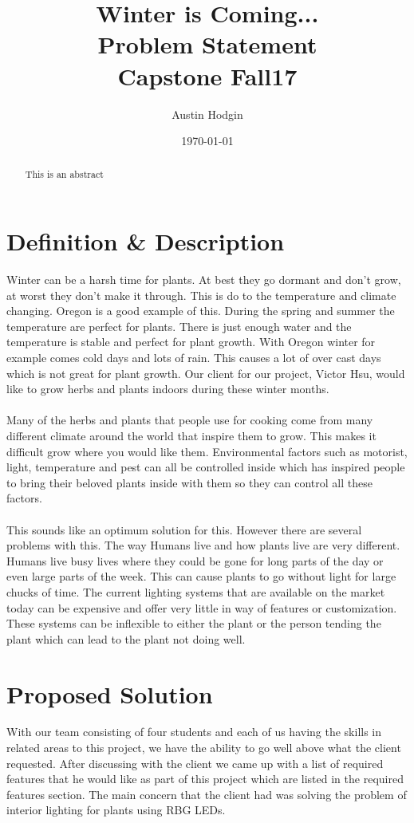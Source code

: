 \documentclass[letterpaper,10pt,draftclsnofoot,onecolumn]{article}
\title{Winter is Coming...\\\large Problem Statement\\\large Capstone Fall17}
\author{Austin Hodgin}
\date{\today}
\begin{document}
	\begin{titlingpage}
		\maketitle
		\begin{abstract}
			This is an abstract
		\end{abstract}
	\end{titlingpage}

	\section*{Definition \& Description}
	Winter can be a harsh time for plants. At best they go dormant and don't grow, at worst they don't make it through. This is do to the temperature and climate  changing. Oregon is a good example of this. During the spring and summer the temperature are perfect for plants. There is just enough water and the 	  					temperature is stable and perfect for plant growth. With Oregon winter for example comes cold days and lots of rain. This causes a lot of over cast days which is not great for plant growth. Our client for our project, Victor Hsu, would like to grow herbs and plants indoors during these winter months.  
	\\
	\\
	Many of the herbs and plants that people use for cooking come from many different climate around the world that inspire them to grow. This makes it difficult grow where you would like them. Environmental factors such as motorist, light, temperature and pest can all be controlled inside which has inspired people to bring their beloved plants inside with them so they can control all these factors. 
	\\
	\\
	This sounds like an optimum solution for this. However there are several problems with this. The way Humans live and how plants live are very different. Humans live busy lives where they could be gone for long parts of the day or even large parts of the week. This can cause plants to go without light for large chucks of time. The current lighting systems that are available on the market today can be expensive and offer very little in way of features or customization. These systems can be inflexible to either the plant or the person tending the plant which can lead to the plant not doing well. 
	


	\section*{Proposed Solution}
	With our team consisting of four students and each of us having the skills in related areas to this project, we have the ability to go well above what the client requested. After discussing with the client we came up with a list of required features that he would like as part of this project which are listed in the required features section. The main concern that the client had was solving the problem of interior lighting for plants using RBG LEDs. 
\end{document}
